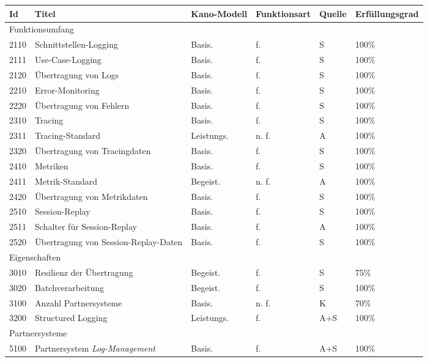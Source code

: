 \begingroup
\centering
\setlength{\LTleft}{-20cm plus -1fill}
\setlength{\LTright}{\LTleft}
\begin{longtable}{|p{0.85cm}|p{6.2cm}|p{1.55cm}|p{1.75cm}|p{1.1cm}|p{1.8cm}|}
\hline
Id & Titel & Kano-Modell & Funktions\-art & Quelle & Erfüllungs\-grad \\
\endhead
\hline
\multicolumn{6}{|l|}{Funktionsumfang} \\
\hline
2110 & Schnittstellen-Logging & Basis. & f. & S & 100\% \\
\hline
2111 & Use-Case-Logging & Basis. & f. & S & 100\% \\
\hline
2120 & Übertragung von Logs & Basis. & f. & S & 100\% \\
\hline
2210 & Error-Monitoring & Basis. & f. & S & 100\% \\
\hline
2220 & Übertragung von Fehlern & Basis. & f. & S & 100\% \\
\hline
2310 & Tracing & Basis. & f. & S & 100\% \\
\hline
2311 & Tracing-Standard & Leistungs. & n. f. & A & 100\% \\
\hline
2320 & Übertragung von Tracingdaten & Basis. & f. & S & 100\% \\
\hline
2410 & Metriken & Basis. & f. & S & 100\% \\
\hline
2411 & Metrik-Standard & Begeist. & n. f. & A & 100\% \\
\hline
2420 & Übertragung von Metrikdaten & Basis. & f. & S & 100\% \\
\hline
2510 & Session-Replay & Basis. & f. & S & 100\% \\
\hline
2511 & Schalter für Session-Replay & Basis. & f. & A & 100\% \\
\hline
2520 & Übertragung von Session-Replay-Daten & Basis. & f. & S & 100\% \\
\hline
\multicolumn{6}{|l|}{Eigenschaften} \\
\hline
3010 & Resilienz der Übertragung & Begeist. & f. & S & 75\% \\
\hline
3020 & Batchverarbeitung & Begeist. & f. & S & 100\% \\
\hline
3100 & Anzahl Partnersysteme & Basis. & n. f. & K & 70\% \\
\hline
3200 & Structured Logging & Leistungs. & f. & A+S & 100\% \\
\hline
\multicolumn{6}{|l|}{Partnersysteme} \\
\hline
5100 & Partnersystem \textit{Log-Management} & Basis. & f. & A+S & 100\% \\

\end{longtable}
